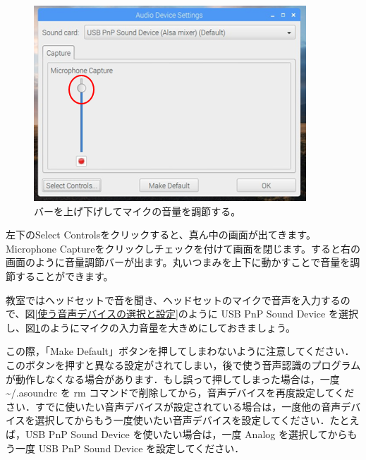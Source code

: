 \begin{figure}[H]
\begin{minipage}[t]{0.3\linewidth}
\begin{center}
    \label{音量変更2}
\end{center}
\end{minipage}
\begin{minipage}[t]{0.3\linewidth}
\begin{center}
    \includegraphics[width=\linewidth]{images/chap06/text06-img008.png}
    \caption{バーを上げ下げしてマイクの音量を調節する。}
    \label{音量変更3}
\end{center}
\end{minipage}
\end{figure}

左下のSelect Controlsをクリックすると、真ん中の画面が出てきます。Microphone Captureをクリックしチェックを付けて画面を閉じます。すると右の画面のように音量調節バーが出ます。丸いつまみを上下に動かすことで音量を調節することができます。

教室ではヘッドセットで音を聞き、ヘッドセットのマイクで音声を入力するので、図\ref{使う音声デバイスの選択と設定}のように USB PnP Sound Device を選択し、図\ref{音量変更3}のようにマイクの入力音量を大きめにしておきましょう。

この際，「Make Default」ボタンを押してしまわないように注意してください．このボタンを押すと異なる設定がされてしまい，後で使う音声認識のプログラムが動作しなくなる場合があります．もし誤って押してしまった場合は，一度  \textasciitilde /.asoundrc を rm コマンドで削除してから，音声デバイスを再度設定してください．すでに使いたい音声デバイスが設定されている場合は，一度他の音声デバイスを選択してからもう一度使いたい音声デバイスを設定してください．たとえば，USB PnP Sound Device を使いたい場合は，一度 Analog を選択してからもう一度 USB PnP Sound Device を設定してください．
